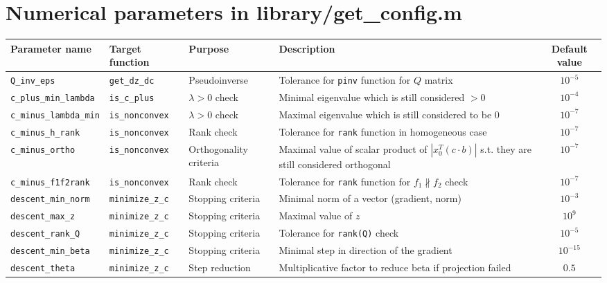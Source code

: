 \documentclass[a4paper]{article}
\begin{document}
\newpage

\section{Numerical parameters in {\rm library/get\_config.m}}

\hspace{-7em}
\renewcommand{\arraystretch}{2.2}
\begin{tabular}{|p{47mm}|p{27mm}|p{34mm}|p{130mm}|c|}
	\hline
	\bf Parameter name & \bf Target function & \bf Purpose & \bf Description & \bf Default value\\\hline
	{\tt Q\_inv\_eps} & {\tt get\_dz\_dc} & Pseudoinverse & Tolerance for {\tt pinv} function for $Q$ matrix & $10^{-5}$ \\\hline
	{\tt c\_plus\_min\_lambda} & {\tt is\_c\_plus} & $\lambda > 0$ check & Minimal eigenvalue which is still considered $> 0$ & $10^{-4}$ \\\hline
	{\tt c\_minus\_lambda\_min} & {\tt is\_nonconvex} & $\lambda > 0$ check & Maximal eigenvalue which is still considered to be $0$ & $10^{-7}$ \\\hline
	{\tt c\_minus\_h\_rank} & {\tt is\_nonconvex} & Rank check & Tolerance for {\tt rank} function in homogeneous case & $10^{-7}$ \\\hline
	{\tt c\_minus\_ortho} & {\tt is\_nonconvex} & Orthogonality criteria & Maximal value of scalar product of $|x_0^T (c \cdot b)|$ s.t. they are still considered orthogonal & $10^{-7}$ \\\hline
	{\tt c\_minus\_f1f2rank} & {\tt is\_nonconvex} & Rank check & Tolerance for {\tt rank} function for $f_1 \nparallel f_2$ check & $10^{-7}$ \\\hline
	{\tt descent\_min\_norm} & {\tt minimize\_z\_c} & Stopping criteria & Minimal norm of a vector (gradient, norm) & $10^{-3}$ \\\hline
	{\tt descent\_max\_z} & {\tt minimize\_z\_c} & Stopping criteria & Maximal value of $z$ & $10^{9}$ \\\hline
	{\tt descent\_rank\_Q} & {\tt minimize\_z\_c} & Stopping criteria & Tolerance for {\tt rank(Q)} check & $10^{-5}$ \\\hline
	{\tt descent\_min\_beta} & {\tt minimize\_z\_c} & Stopping criteria & Minimal step in direction of the gradient & $10^{-15}$ \\\hline
	{\tt descent\_theta} & {\tt minimize\_z\_c} & Step reduction & Multiplicative factor to reduce beta if projection failed & $0.5$ \\\hline

\end{tabular}
\end{document}
